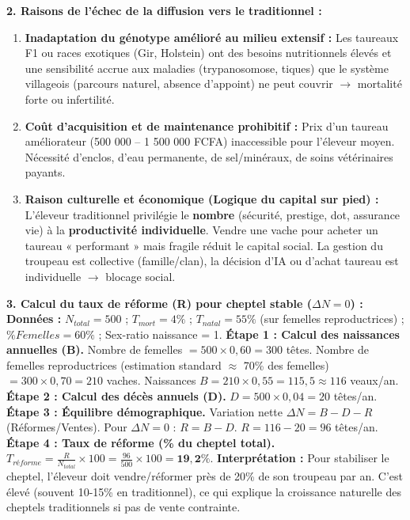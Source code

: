 \documentclass[11pt]{article}
\begin{document}
\begin{exoresolu}
\textbf{2. Raisons de l'échec de la diffusion vers le traditionnel :}
\begin{enumerate}
    \item \textbf{Inadaptation du génotype amélioré au milieu extensif :} Les taureaux F1 ou races exotiques (Gir, Holstein) ont des besoins nutritionnels élevés et une sensibilité accrue aux maladies (trypanosomose, tiques) que le système villageois (parcours naturel, absence d'appoint) ne peut couvrir $\rightarrow$ mortalité forte ou infertilité.
    \item \textbf{Coût d'acquisition et de maintenance prohibitif :} Prix d'un taureau améliorateur (500 000 -- 1 500 000 FCFA) inaccessible pour l'éleveur moyen. Nécessité d'enclos, d'eau permanente, de sel/minéraux, de soins vétérinaires payants.
    \item \textbf{Raison culturelle et économique (Logique du capital sur pied) :} L'éleveur traditionnel privilégie le \textbf{nombre} (sécurité, prestige, dot, assurance vie) à la \textbf{productivité individuelle}. Vendre une vache pour acheter un taureau « performant » mais fragile réduit le capital social. La gestion du troupeau est collective (famille/clan), la décision d'IA ou d'achat taureau est individuelle $\rightarrow$ blocage social.
\end{enumerate}

\textbf{3. Calcul du taux de réforme (R) pour cheptel stable ($\Delta N = 0$) :}
\textbf{Données :} $N_{total} = 500$ ; $T_{mort} = 4\%$ ; $T_{natal} = 55\%$ (sur femelles reproductrices) ; $\% Femelles = 60\%$ ; Sex-ratio naissance = 1.
\textbf{Étape 1 : Calcul des naissances annuelles (B).}
Nombre de femelles $= 500 \times 0,60 = 300$ têtes.
Nombre de femelles reproductrices (estimation standard $\approx$ 70\% des femelles) $= 300 \times 0,70 = 210$ vaches.
Naissances $B = 210 \times 0,55 = 115,5 \approx 116$ veaux/an.
\textbf{Étape 2 : Calcul des décès annuels (D).}
$D = 500 \times 0,04 = 20$ têtes/an.
\textbf{Étape 3 : Équilibre démographique.}
Variation nette $\Delta N = B - D - R$ (Réformes/Ventes).
Pour $\Delta N = 0$ : $R = B - D$.
$R = 116 - 20 = 96$ têtes/an.
\textbf{Étape 4 : Taux de réforme (\% du cheptel total).}
$T_{réforme} = \frac{R}{N_{total}} \times 100 = \frac{96}{500} \times 100 = \mathbf{19,2\%}$.
\textbf{Interprétation :} Pour stabiliser le cheptel, l'éleveur doit vendre/réformer près de 20\% de son troupeau par an. C'est élevé (souvent 10-15\% en traditionnel), ce qui explique la croissance naturelle des cheptels traditionnels si pas de vente contrainte.
\end{exoresolu}
\end{document}
